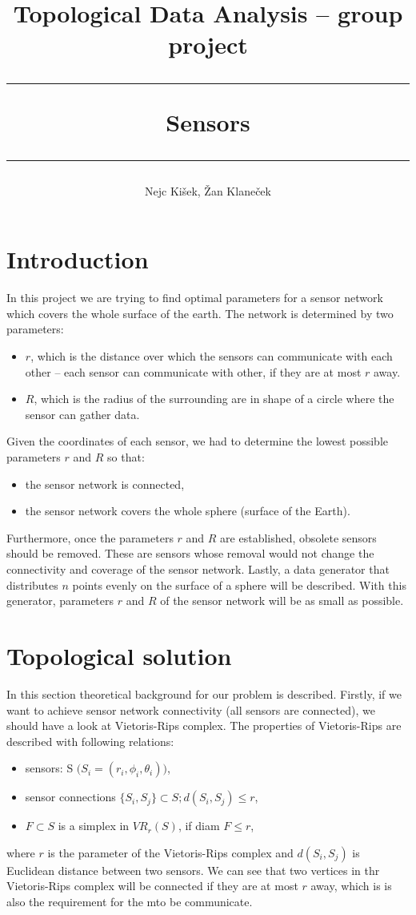 \documentclass[a4paper, 12pt]{article}
\title{
{	\vspace{3mm}
	\large Topological Data Analysis -- group project} \\
	\vspace{5mm}
	\hrule
	\vspace{3mm}
Sensors
	\vspace{3mm}
	\hrule
	\vspace{5mm}
}
\author{
	Nejc Ki\v sek,
	\v Zan Klane\v cek
}
\begin{document}
\maketitle

\vspace{8mm}


\section{Introduction}
In this project we are trying to find optimal parameters for a sensor network which covers the whole surface of the earth. The network is determined by two parameters: 
\begin{itemize}
	\item $r$, which is the distance over which the sensors can communicate with each other -- each sensor can communicate with other, if they are at most $r$ away.
	\item $R$, which is the radius of the surrounding are in shape of a circle where the sensor can gather data.
\end{itemize}

\noindent Given the coordinates of each sensor, we had to determine the lowest possible parameters $r$ and $R$ so that:

\begin{itemize}
	\item {the sensor network is connected,}
	\item {the sensor network covers the whole sphere (surface of the Earth).}
\end{itemize}
Furthermore, once the parameters $r$ and $R$ are established, obsolete sensors should be removed. These are sensors whose removal would not change the connectivity and coverage of the sensor network. Lastly, a data generator that distributes $n$ points evenly on the surface of a sphere will be described. With this generator, parameters $r$ and $R$ of the sensor network will be as small as possible.
\section{Topological solution}

In this section theoretical background for our problem is described. Firstly, if we want to achieve sensor network connectivity (all sensors are connected), we should have a look at Vietoris-Rips complex. The properties of Vietoris-Rips are described with following relations:

\begin{itemize}
	\item {sensors: S $\big(S_i = (r_i, \phi_i, \theta_i)\big)$,}
	\item {sensor connections $\{S_i, S_j\} \subset S; d(S_i, S_j) \leq r$,}
	\item {$F \subset S$ is a simplex in $VR_r(S)$, if diam $F \leq r$,}
\end{itemize} 
where $r$ is the parameter of the Vietoris-Rips complex and $d(S_i, S_j)$ is Euclidean distance between two sensors. We can see that two vertices in thr Vietoris-Rips complex will be connected if they are at most $r$ away, which is is also the requirement for the mto be communicate. 
\end{document}
